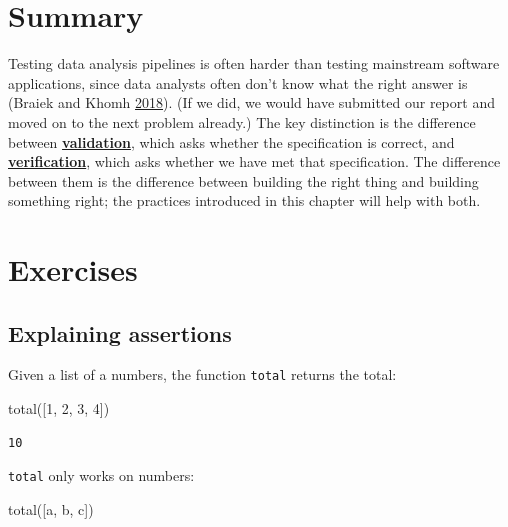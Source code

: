 \documentclass[
]{krantz}
\makeatletter
\newenvironment{Shaded}{\begin{snugshade}}{\end{snugshade}}
\newcommand{\DecValTok}[1]{\textcolor[rgb]{0.00,0.00,0.81}{#1}}
\newcommand{\NormalTok}[1]{#1}
\newcommand{\StringTok}[1]{\textcolor[rgb]{0.31,0.60,0.02}{#1}}
\newenvironment{kframe}{%
\medskip{}
\setlength{\fboxsep}{.8em}
 \def\at@end@of@kframe{}%
 \ifinner\ifhmode%
  \def\at@end@of@kframe{\end{minipage}}%
  \begin{minipage}{\columnwidth}%
 \fi\fi%
 \def\FrameCommand##1{\hskip\@totalleftmargin \hskip-\fboxsep
 \colorbox{shadecolor}{##1}\hskip-\fboxsep
     \hskip-\linewidth \hskip-\@totalleftmargin \hskip\columnwidth}%
 \MakeFramed {\advance\hsize-\width
   \@totalleftmargin\z@ \linewidth\hsize
   \@setminipage}}%
 {\par\unskip\endMakeFramed%
 \at@end@of@kframe}
\renewenvironment{Shaded}{\begin{kframe}}{\end{kframe}}
\newcommand{\gref}[2]{\hyperlink{#2}{\textbf{#1}}}
\makeatother
\begin{document}
\hypertarget{testing-summary}{%
\section{Summary}\label{testing-summary}}

Testing data analysis pipelines is often harder than testing mainstream software applications,
since data analysts often don't know what the right answer is (Braiek and Khomh \protect\hyperlink{ref-Brai2018}{2018}).
(If we did,
we would have submitted our report and moved on to the next problem already.)
The key distinction is the difference between \gref{validation}{validation},
which asks whether the specification is correct,
and \gref{verification}{verification},
which asks whether we have met that specification.
The difference between them is the difference between
building the right thing and building something right;
the practices introduced in this chapter will help with both.

\hypertarget{testing-exercises}{%
\section{Exercises}\label{testing-exercises}}

\hypertarget{testing-ex-explain-assertions}{%
\subsection{Explaining assertions}\label{testing-ex-explain-assertions}}

Given a list of a numbers,
the function \texttt{total} returns the total:

\begin{Shaded}
\begin{Highlighting}[]
\NormalTok{total([}\DecValTok{1}\NormalTok{, }\DecValTok{2}\NormalTok{, }\DecValTok{3}\NormalTok{, }\DecValTok{4}\NormalTok{])}
\end{Highlighting}
\end{Shaded}

\begin{verbatim}
10
\end{verbatim}

\texttt{total} only works on numbers:

\begin{Shaded}
\begin{Highlighting}[]
\NormalTok{total([}\StringTok{\textquotesingle{}a\textquotesingle{}}\NormalTok{, }\StringTok{\textquotesingle{}b\textquotesingle{}}\NormalTok{, }\StringTok{\textquotesingle{}c\textquotesingle{}}\NormalTok{])}
\end{Highlighting}
\end{Shaded}
\end{document}
